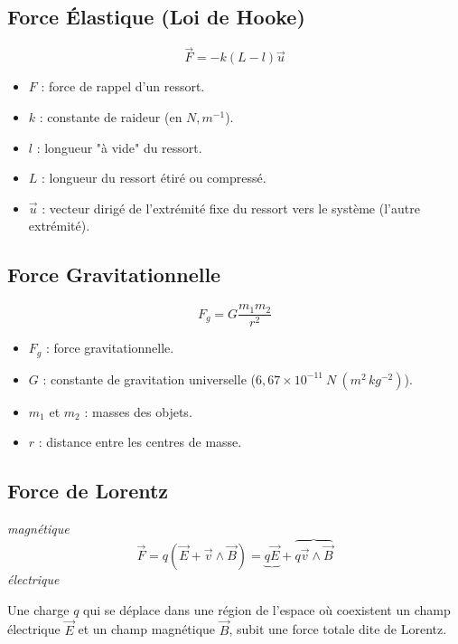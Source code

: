 \documentclass[a4paper,12pt]{article}
\renewcommand{\vec}{\overrightarrow}  %
\begin{document}
\begin{multicols}{2}
        \subsection{Force Élastique (Loi de Hooke)}
                $$ \vec{F} = -k (L- l) \vec{u} $$
            \begin{itemize}[label=$\bullet$]
                \item $F$ : force de rappel d'un ressort.
                \item $k$ : constante de raideur (en $N , m^{-1}$).
                \item $l$ : longueur "à vide" du ressort.
                \item $L$ : longueur du ressort étiré ou compressé.
                \item $\vec{u}$ : vecteur dirigé de l'extrémité fixe du ressort vers le système (l'autre extrémité).
            \end{itemize}
            
        \subsection{Force Gravitationnelle}
                $$ F_g = G \frac{m_1 m_2}{r^2} $$
            \begin{itemize}[label=$\bullet$]
                \item $F_g$ : force gravitationnelle.
                \item $G$ : constante de gravitation universelle ($6,67 \times 10^{-11} \ N \ (m^2 \, kg^{-2})$).
                \item $m_1$ et $m_2$ : masses des objets.
                \item $r$ : distance entre les centres de masse.
            \end{itemize}

        \subsection{Force de Lorentz}
            \hspace{5.3cm} \textit{magnétique}
            $$ \vec{F} = q(\vec{E} + \vec{v} \wedge \vec{B}) = \underbrace{q\vec{E}} + \overbrace{q \vec{v} \wedge \vec{B}} $$
            \hspace{4.5cm} \textit{électrique}

            Une charge $q$ qui se déplace dans une région de l'espace où coexistent 
            un champ électrique $\vec{E}$ et un champ magnétique $\vec{B}$, subit une force 
            totale dite de Lorentz.


\end{multicols}
\end{document}
